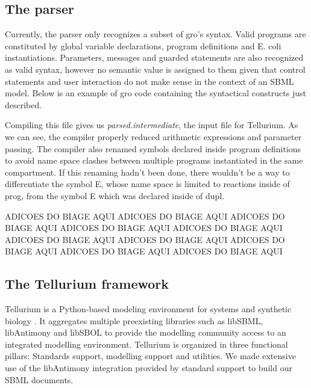 \documentclass[12pt]{article}
\begin{document}
\subsection{The parser}
    
    Currently, the parser only recognizes a subset of gro's syntax. Valid programs are constituted by global variable declarations, program definitions and E. coli instantiations. Parameters, messages and guarded statements are also recognized as valid syntax, however no semantic value is assigned to them given that control statements and user interaction do not make sense in the context of an SBML model. Below is an example of gro code containing the syntactical constructs just described.
    
    
    
    Compiling this file gives us \textit{parsed.intermediate}, the input file for Tellurium. As we can see, the compiler properly reduced arithmetic expressions and parameter passing. The compiler also renamed symbols declared inside program definitions to avoid name space clashes between multiple programs instantiated in the same compartment. If this renaming hadn't been done, there wouldn't be a way to differentiate the symbol E, whose name space is limited to reactions inside of prog, from the symbol E which was declared inside of dupl.
    
    ADICOES DO BIAGE AQUI ADICOES DO BIAGE AQUI ADICOES DO BIAGE AQUI ADICOES DO BIAGE AQUI ADICOES DO BIAGE AQUI ADICOES DO BIAGE AQUI ADICOES DO BIAGE AQUI ADICOES DO BIAGE AQUI ADICOES DO BIAGE AQUI ADICOES DO BIAGE AQUI
    
    
    
\subsection{The Tellurium framework}

    Tellurium is a Python-based modeling environment for systems and synthetic biology \cite{Choi2018}. It aggregates multiple preexisting libraries such as libSBML, libAntimony and libSBOL to provide the modelling community access to an integrated modelling environment. Tellurium is organized in three functional pillars: Standards support, modelling support and utilities. We made extensive use of the libAntimony integration provided by standard support to build our SBML documents.
\end{document}

